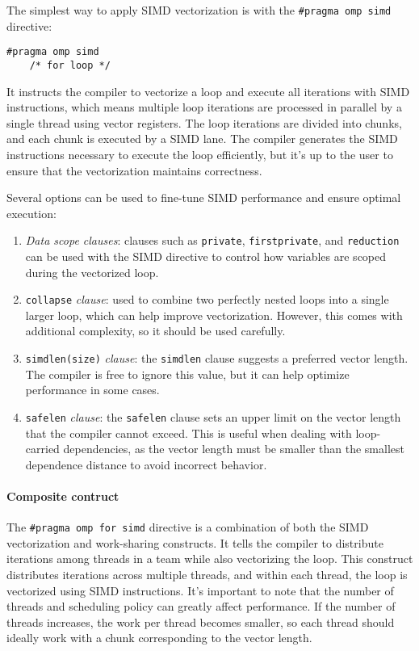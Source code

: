 The simplest way to apply SIMD vectorization is with the \texttt{\#pragma omp simd} directive: 
\begin{lstlisting}[style=C]
#pragma omp simd
    /* for loop */
\end{lstlisting}
It instructs the compiler to vectorize a loop and execute all iterations with SIMD instructions, which means multiple loop iterations are processed in parallel by a single thread using vector registers.
The loop iterations are divided into chunks, and each chunk is executed by a SIMD lane. 
The compiler generates the SIMD instructions necessary to execute the loop efficiently, but it's up to the user to ensure that the vectorization maintains correctness.

Several options can be used to fine-tune SIMD performance and ensure optimal execution:
\begin{enumerate}
    \item \textit{Data scope clauses}: clauses such as \texttt{private}, \texttt{firstprivate}, and \texttt{reduction} can be used with the SIMD directive to control how variables are scoped during the vectorized loop.
    \item \texttt{collapse} \textit{clause}: used to combine two perfectly nested loops into a single larger loop, which can help improve vectorization. 
        However, this comes with additional complexity, so it should be used carefully.
    \item \texttt{simdlen(size)} \textit{clause}: the \texttt{simdlen} clause suggests a preferred vector length. 
        The compiler is free to ignore this value, but it can help optimize performance in some cases.
    \item \texttt{safelen} \textit{clause}: the \texttt{safelen} clause sets an upper limit on the vector length that the compiler cannot exceed. 
        This is useful when dealing with loop-carried dependencies, as the vector length must be smaller than the smallest dependence distance to avoid incorrect behavior.
\end{enumerate}

\paragraph*{Composite contruct}
The \texttt{\#pragma omp for simd} directive is a combination of both the SIMD vectorization and work-sharing constructs. 
It tells the compiler to distribute iterations among threads in a team while also vectorizing the loop.
\noindent This construct distributes iterations across multiple threads, and within each thread, the loop is vectorized using SIMD instructions. 
It's important to note that the number of threads and scheduling policy can greatly affect performance. 
If the number of threads increases, the work per thread becomes smaller, so each thread should ideally work with a chunk corresponding to the vector length.

